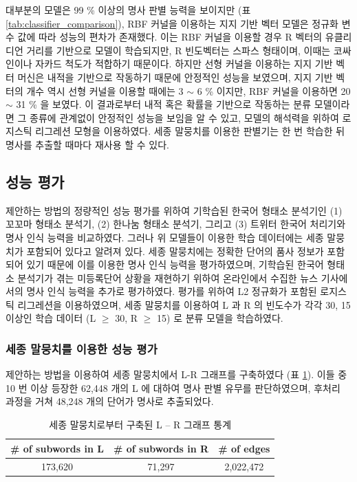 \documentclass[11pt]{article}
\begin{document}
대부분의 모델은 99 \% 이상의 명사 판별 능력을 보이지만 (표 \ref{tab:classifier_comparison}), RBF 커널을 이용하는 지지 기반 벡터 모델은 정규화 변수 값에 따라 성능의 편차가 존재했다.
이는 RBF 커널을 이용할 경우 R 벡터의 유클리디언 거리를 기반으로 모델이 학습되지만, R 빈도벡터는 스파스 형태이며, 이때는 코싸인이나 자카드 척도가 적합하기 때문이다.
하지만 선형 커널을 이용하는 지지 기반 벡터 머신은 내적을 기반으로 작동하기 때문에 안정적인 성능을 보였으며, 지지 기반 벡터의 개수 역시 선형 커널을 이용할 때에는 3 $\sim$ 6 \% 이지만, RBF 커널을 이용하면 20 $\sim$ 31 \%  을 보였다.
이 결과로부터 내적 혹은 확률을 기반으로 작동하는 분류 모델이라면 그 종류에 관계없이 안정적인 성능을 보임을 알 수 있고, 모델의 해석력을 위하여 로지스틱 리그레션 모형을 이용하였다.
세종 말뭉치를 이용한 판별기는 한 번 학습한 뒤 명사를 추출할 때마다 재사용 할 수 있다.


\subsection{성능 평가}

제안하는 방법의 정량적인 성능 평가를 위하여 기학습된 한국어 형태소 분석기인 (1) 꼬꼬마 형태소 분석기, (2) 한나눔 형태소 분석기, 그리고 (3) 트위터 한국어 처리기와 명사 인식 능력을 비교하였다.
그러나 위 모델들이 이용한 학습 데이터에는 세종 말뭉치가 포함되어 있다고 알려져 있다.
세종 말뭉치에는 정확한 단어의 품사 정보가 포함되어 있기 때문에 이를 이용한 명사 인식 능력을 평가하였으며, 기학습된 한국어 형태소 분석기가 겪는 미등록단어 상황을 재현하기 위하여 온라인에서 수집한 뉴스 기사에서의 명사 인식 능력을 추가로 평가하였다.
평가를 위하여 L2 정규화가 포함된 로지스틱 리그레션을 이용하였으며, 세종 말뭉치를 이용하여 L 과 R 의 빈도수가 각각 30, 15 이상인 학습 데이터 (L $\geq$ 30, R $\geq$ 15) 로 분류 모델을 학습하였다.

\subsubsection{세종 말뭉치를 이용한 성능 평가}

제안하는 방법을 이용하여 세종 말뭉치에서 L-R 그래프를 구축하였다 (표 \ref{tab:sejong_statistics}).
이들 중 10 번 이상 등장한 62,448 개의 L 에 대하여 명사 판별 유무를 판단하였으며, 후처리 과정을 거쳐 48,248 개의 단어가 명사로 추출되었다.

\begin{table}[ht]
\centering
\caption{세종 말뭉치로부터 구축된 L – R 그래프 통계}
\label{tab:sejong_statistics}
\begin{tabular}{|c|c|c|}
\hline
\rowcolor[HTML]{EFEFEF} 
\# of subwords in L & \# of subwords in R & \# of edges \\ \hline
173,620 & 71,297 & 2,022,472   \\ \hline
\end{tabular}%
\end{table}
\end{document}
